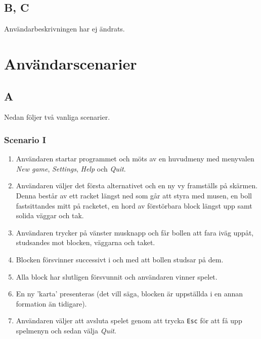 \documentclass[11pt,a4paper]{article}
\begin{document}
\subsection{B, C}
Användarbeskrivningen har ej ändrats.

\section{Användarscenarier}

\subsection{A}
Nedan följer två vanliga scenarier.

\subsubsection{Scenario I}
\begin{enumerate}
	\item Användaren startar programmet och möts av en huvudmeny med menyvalen \emph{New game}, \emph{Settings}, \emph{Help} och \emph{Quit}.
	\item Användaren väljer det första alternativet och en ny vy framställs på skärmen. Denna består av ett racket längst ned som går att styra med musen, en boll fastsittandes mitt på racketet, en hord av förstörbara block längst upp samt solida väggar och tak.
	\item Användaren trycker på vänster musknapp och får bollen att fara iväg uppåt, studsandes mot blocken, väggarna och taket.
	\item Blocken försvinner successivt i och med att bollen studsar på dem.
	\item Alla block har slutligen försvunnit och användaren vinner spelet.
	\item En ny 'karta' presenteras (det vill säga, blocken är uppställda i en annan formation än tidigare).
	\item Användaren väljer att avsluta spelet genom att trycka \texttt{Esc} för att få upp spelmenyn och sedan välja \emph{Quit}.
\end{enumerate}
\end{document}
